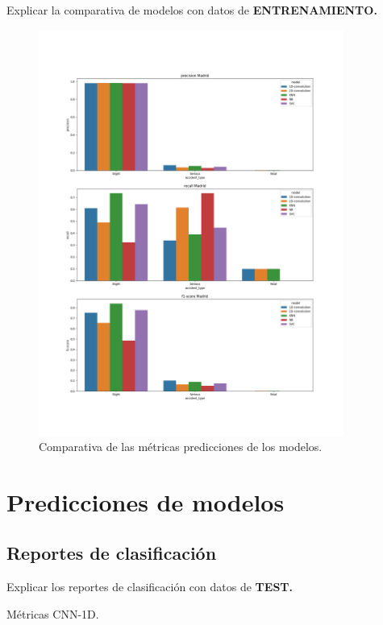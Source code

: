     Explicar la comparativa de modelos con datos de \textbf{ENTRENAMIENTO.}


    \begin{figure}[h]
        \centering
        \includegraphics[width=10cm]{archivos/5.Resultados/Comparativa}
        \caption{Comparativa de las métricas predicciones de los modelos.}
        \label{ResultsImage}
     \end{figure}



\section{Predicciones de modelos}

  \subsection{Reportes de clasificación}

    Explicar los reportes de clasificación con datos de \textbf{TEST.}

    \begin{table}[H]
      \centering
      \caption{Métricas CNN-1D.}
      \label{CNN1DMetrics}
    \end{table}

